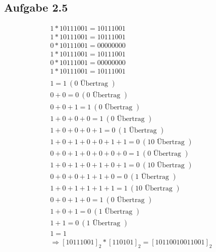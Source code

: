 \documentclass[12pt,a4paper]{article}
\begin{document}
\subsection*{Aufgabe 2.5}
\begin{align*}
1 * 10111001 = 10111001 \\
1 * 10111001 = 10111001 \\
0 * 10111001 = 00000000 \\
1 * 10111001 = 10111001 \\
0 * 10111001 = 00000000 \\
1 * 10111001 = 10111001 \\
\\
1 = 1 ~(0 \textrm{ Übertrag }) \\
0 + 0 = 0 ~(0 \textrm{ Übertrag }) \\
0 + 0 + 1 = 1 ~(0 \textrm{ Übertrag }) \\
1 + 0 + 0 + 0 = 1 ~(0 \textrm{ Übertrag }) \\
1 + 0 + 0 + 0 + 1 = 0 ~(1 \textrm{ Übertrag }) \\
1 + 0 + 1 + 0 + 0 + 1 + 1 = 0 ~(10 \textrm{ Übertrag }) \\
0 + 0 + 1 + 0 + 0 + 0 + 0 = 1 ~(0 \textrm{ Übertrag }) \\
1 + 0 + 1 + 0 + 1 + 0 + 1 = 0 ~(10 \textrm{ Übertrag }) \\
0 + 0 + 0 + 1 + 1 + 0 = 0 ~(1 \textrm{ Übertrag }) \\
1 + 0 + 1 + 1 + 1 + 1 = 1 ~(10 \textrm{ Übertrag }) \\
0 + 0 + 1 + 0 = 1 ~(0 \textrm{ Übertrag }) \\
1 + 0 + 1 = 0 ~(1 \textrm{ Übertrag }) \\
1 + 1 = 0 ~(1 \textrm{ Übertrag }) \\
1 = 1 \\
\Rightarrow [10111001]_{2} * [110101]_{2} = [10110010011001]_{2}
\end{align*}
\end{document}
